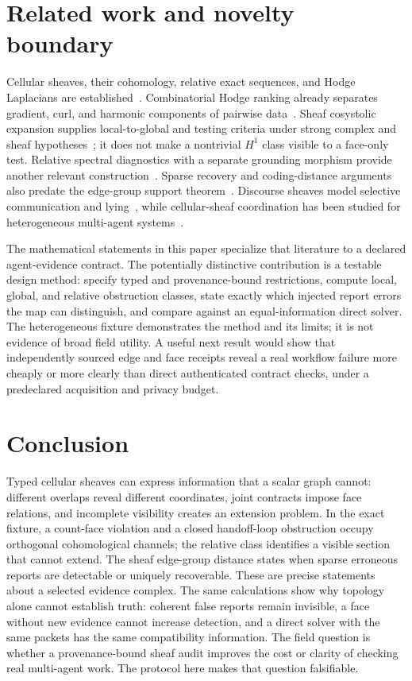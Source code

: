 \documentclass[11pt,a4paper]{article}
\begin{document}
\section{Related work and novelty boundary}\label{sec:related}
Cellular sheaves, their cohomology, relative exact sequences, and Hodge Laplacians are established~\cite{curry2013,hansen2019}. Combinatorial Hodge ranking already separates gradient, curl, and harmonic components of pairwise data~\cite{jiang2009}. Sheaf cosystolic expansion supplies local-to-global and testing criteria under strong complex and sheaf hypotheses~\cite{first2024}; it does not make a nontrivial $H^1$ class visible to a face-only test. Relative spectral diagnostics with a separate grounding morphism provide another relevant construction~\cite{yokoyama2026}. Sparse recovery and coding-distance arguments also predate the edge-group support theorem~\cite{zhao2018}. Discourse sheaves model selective communication and lying~\cite{hansen2020}, while cellular-sheaf coordination has been studied for heterogeneous multi-agent systems~\cite{hanks2025,seely2026}.

The mathematical statements in this paper specialize that literature to a declared agent-evidence contract. The potentially distinctive contribution is a testable design method: specify typed and provenance-bound restrictions, compute local, global, and relative obstruction classes, state exactly which injected report errors the map can distinguish, and compare against an equal-information direct solver. The heterogeneous fixture demonstrates the method and its limits; it is not evidence of broad field utility. A useful next result would show that independently sourced edge and face receipts reveal a real workflow failure more cheaply or more clearly than direct authenticated contract checks, under a predeclared acquisition and privacy budget.

\section{Conclusion}\label{sec:conclusion}
Typed cellular sheaves can express information that a scalar graph cannot: different overlaps reveal different coordinates, joint contracts impose face relations, and incomplete visibility creates an extension problem. In the exact fixture, a count-face violation and a closed handoff-loop obstruction occupy orthogonal cohomological channels; the relative class identifies a visible section that cannot extend. The sheaf edge-group distance states when sparse erroneous reports are detectable or uniquely recoverable. These are precise statements about a selected evidence complex. The same calculations show why topology alone cannot establish truth: coherent false reports remain invisible, a face without new evidence cannot increase detection, and a direct solver with the same packets has the same compatibility information. The field question is whether a provenance-bound sheaf audit improves the cost or clarity of checking real multi-agent work. The protocol here makes that question falsifiable.
\end{document}
